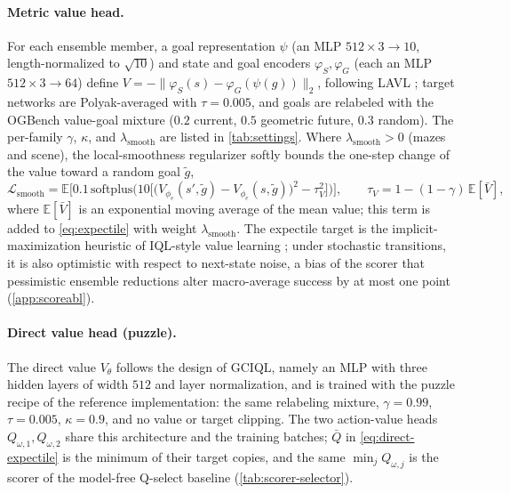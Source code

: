 \documentclass{article}
\theoremstyle{plain}
\theoremstyle{definition}
\theoremstyle{plain}
\newcommand{\E}{\mathbb{E}}
\begin{document}
\paragraph{Metric value head.} For each ensemble member, a goal representation $\psi$ (an MLP $512\times3\rightarrow10$, length-normalized to $\sqrt{10}$) and state and goal encoders $\varphi_S,\varphi_G$ (each an MLP $512\times3\rightarrow64$) define $V=-\|\varphi_S(s)-\varphi_G(\psi(g))\|_2$, following LAVL \citep{kang2026lavl}; target networks are Polyak-averaged with $\tau=0.005$, and goals are relabeled with the OGBench value-goal mixture ($0.2$ current, $0.5$ geometric future, $0.3$ random). The per-family $\gamma$, $\kappa$, and $\lambda_{\mathrm{smooth}}$ are listed in \cref{tab:settings}. Where $\lambda_{\mathrm{smooth}}>0$ (mazes and scene), the local-smoothness regularizer softly bounds the one-step change of the value toward a random goal $\tilde g$,
\begin{equation}
\mathcal{L}_{\mathrm{smooth}}
= \E\Big[0.1\,\mathrm{softplus}\Big(10\big[\big(V_{\phi_e}(s',\tilde g)-V_{\phi_e}(s,\tilde g)\big)^2-\tau_V^2\big]\Big)\Big],
\qquad
\tau_V = 1-(1-\gamma)\,\E[\bar V],
\label{eq:smooth}
\end{equation}
where $\E[\bar V]$ is an exponential moving average of the mean value; this term is added to \cref{eq:expectile} with weight $\lambda_{\mathrm{smooth}}$. The expectile target is the implicit-maximization heuristic of IQL-style value learning \citep{kostrikov2022iql,park2023hiql}; under stochastic transitions, it is also optimistic with respect to next-state noise, a bias of the scorer that pessimistic ensemble reductions alter macro-average success by at most one point (\cref{app:scoreabl}).

\paragraph{Direct value head (puzzle).} The direct value $V_\theta$ follows the design of GCIQL, namely an MLP with three hidden layers of width $512$ and layer normalization, and is trained with the puzzle recipe of the reference implementation: the same relabeling mixture, $\gamma=0.99$, $\tau=0.005$, $\kappa=0.9$, and no value or target clipping. The two action-value heads $Q_{\omega,1},Q_{\omega,2}$ share this architecture and the training batches; $\bar Q$ in \cref{eq:direct-expectile} is the minimum of their target copies, and the same $\min_j Q_{\omega,j}$ is the scorer of the model-free Q-select baseline (\cref{tab:scorer-selector}).
\end{document}
